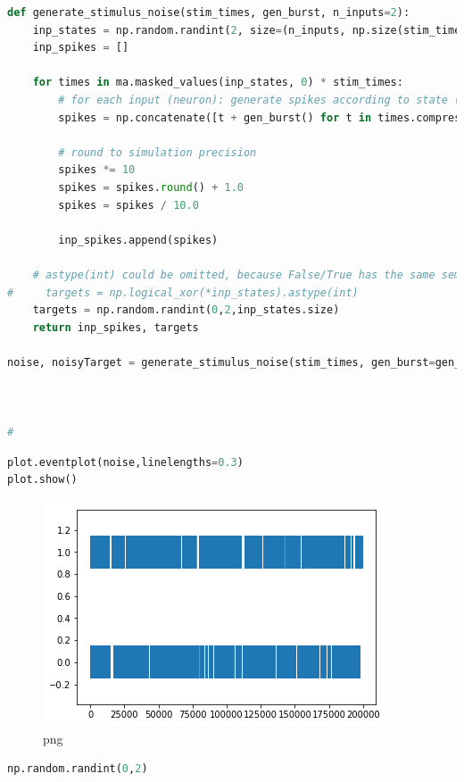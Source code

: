 \begin{lstlisting}[language=Python]
def generate_stimulus_noise(stim_times, gen_burst, n_inputs=2):
    inp_states = np.random.randint(2, size=(n_inputs, np.size(stim_times)))
    inp_spikes = []

    for times in ma.masked_values(inp_states, 0) * stim_times:
        # for each input (neuron): generate spikes according to state (=1) and stimulus time-grid
        spikes = np.concatenate([t + gen_burst() for t in times.compressed()])

        # round to simulation precision
        spikes *= 10
        spikes = spikes.round() + 1.0
        spikes = spikes / 10.0

        inp_spikes.append(spikes)

    # astype(int) could be omitted, because False/True has the same semantics
#     targets = np.logical_xor(*inp_states).astype(int)
    targets = np.random.randint(0,2,inp_states.size)
    return inp_spikes, targets

noise, noisyTarget = generate_stimulus_noise(stim_times, gen_burst=gen_stimulus_pattern)



# 
\end{lstlisting}

\begin{lstlisting}[language=Python]
plot.eventplot(noise,linelengths=0.3)     
plot.show()
\end{lstlisting}

\begin{figure}
\centering
\includegraphics{olfactory_files/olfactory_10_0.png}
\caption{png}
\end{figure}

\begin{lstlisting}[language=Python]
np.random.randint(0,2)
\end{lstlisting}

